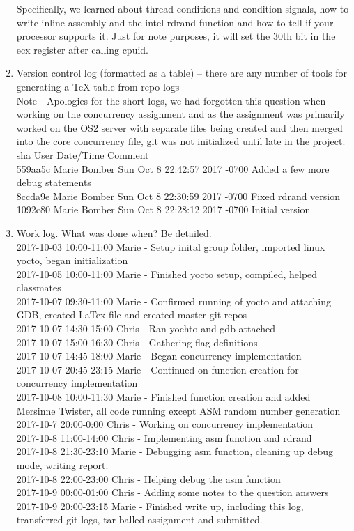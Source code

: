 \documentclass[letterpaper,10pt,titlepage]{article}
\begin{document}
\begin{enumerate}
Specifically, we learned about thread conditions and condition signals, how to write inline assembly and the intel rdrand function and how to tell if your processor supports it. Just for note purposes, it will set the 30th bit in the ecx register after calling cpuid.
\item Version control log (formatted as a table) -- there are any number of tools for generating a TeX table from repo logs\\
Note - Apologies for the short logs, we had forgotten this question when working on the concurrency assignment and as the assignment was primarily worked on the OS2 server with separate files being created and then merged into the core concurrency file, git was not initialized until late in the project.\\

sha	User		Date/Time			Comment\\
559aa5c Marie Bomber     Sun Oct 8 22:42:57 2017 -0700   Added a few more debug statements\\
8ccda9e Marie Bomber     Sun Oct 8 22:30:59 2017 -0700   Fixed rdrand version\\
1092c80 Marie Bomber     Sun Oct 8 22:28:12 2017 -0700   Initial version\\

\item Work log. What was done when? Be detailed.\\
2017-10-03 10:00-11:00 Marie - Setup inital group folder, imported linux yocto, began initialization\\
2017-10-05 10:00-11:00 Marie - Finished yocto setup, compiled, helped classmates\\
2017-10-07 09:30-11:00 Marie - Confirmed running of yocto and attaching GDB, created LaTex file and created master git repos\\
2017-10-07 14:30-15:00 Chris - Ran yochto and gdb attached\\
2017-10-07 15:00-16:30 Chris - Gathering flag definitions\\
2017-10-07 14:45-18:00 Marie - Began concurrency implementation\\
2017-10-07 20:45-23:15 Marie - Continued on function creation for concurrency implementation\\
2017-10-08 10:00-11:30 Marie - Finished function creation and added Mersinne Twister, all code running except ASM random number generation\\
2017-10-7 20:00-0:00 Chris - Working on concurrency implementation\\
2017-10-8 11:00-14:00 Chris - Implementing asm function and rdrand\\
2017-10-8 21:30-23:10 Marie - Debugging asm function, cleaning up debug mode, writing report.\\
2017-10-8 22:00-23:00 Chris - Helping debug the asm function\\
2017-10-9 00:00-01:00 Chris - Adding some notes to the question answers\\
2017-10-9 20:00-23:15 Marie - Finished write up, including this log, transferred git logs, tar-balled assignment and submitted.\\

\end{enumerate}
\end{document}
